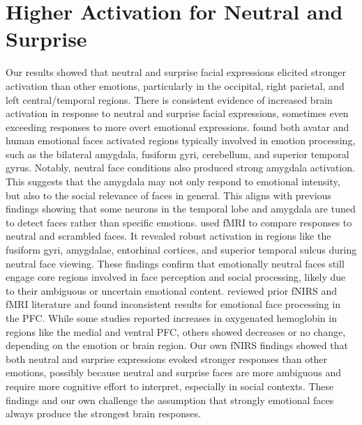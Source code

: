 \section{Higher Activation for Neutral and Surprise}
Our results showed that neutral and surprise facial expressions elicited stronger activation than other emotions, particularly in the occipital, right parietal, and left central/temporal regions.
There is consistent evidence of increased brain activation in response to neutral and surprise facial expressions, sometimes even exceeding responses to more overt emotional expressions.
\cite{moser_amygdala_2007} found both avatar and human emotional faces activated regions typically involved in emotion processing, such as the bilateral amygdala, fusiform gyri, cerebellum, and superior temporal gyrus. 
Notably, neutral face conditions also produced strong amygdala activation. 
This suggests that the amygdala may not only respond to emotional intensity, but also to the social relevance of faces in general. 
This aligns with previous findings showing that some neurons in the temporal lobe and amygdala are tuned to detect faces rather than specific emotions.
\cite{keslerwest_neural_2001} used fMRI to compare responses to neutral and scrambled faces. 
It revealed robust activation in regions like the fusiform gyri, amygdalae, entorhinal cortices, and superior temporal sulcus during neutral face viewing. 
These findings confirm that emotionally neutral faces still engage core regions involved in face perception and social processing, likely due to their ambiguous or uncertain emotional content.
\cite{westgarth_systematic_2021} reviewed prior fNIRS and fMRI literature and found inconsistent results for emotional face processing in the PFC. 
While some studies reported increases in oxygenated hemoglobin in regions like the medial and ventral PFC, others showed decreases or no change, depending on the emotion or brain region. 
Our own fNIRS findings showed that both neutral and surprise expressions evoked stronger responses than other emotions, possibly because neutral and surprise faces are more ambiguous and require more cognitive effort to interpret, especially in social contexts.
These findings and our own challenge the assumption that strongly emotional faces always produce the strongest brain responses. 

